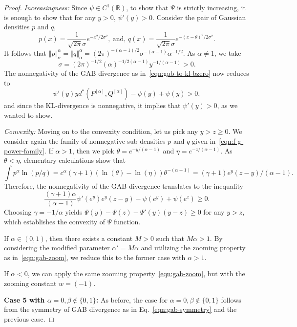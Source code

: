 \documentclass[11pt]{article}
\theoremstyle{plain}
\theoremstyle{remark}
\def\R{\mathbb{R}}
\newcommand{\norm}[1]{\left\Vert #1 \right\Vert}
\begin{document}
\begin{proof}
    \noindent\emph{Increasingness:} Since $\psi \in C^1(\R)$, to show that $\Psi$ is strictly increasing, it is enough to show that for any $y > 0$, $\psi'(y) > 0$. Consider the pair of Gaussian densities $p$ and $q$,
    \begin{equation*}
        p(x) = \dfrac{1}{\sqrt{2\pi} \sigma} e^{-x^2/2\sigma^2}, \
        \text{and, }
        q(x) = \dfrac{1}{\sqrt{2\pi}\sigma}e^{-(x - \theta)^2/2\sigma^2}.
    \end{equation*}
    \noindent It follows that $\norm{p}_{\alpha}^{\alpha} = \norm{q}_{\alpha}^{\alpha} = (2\pi)^{-(\alpha-1)/2}\sigma^{-(\alpha-1)}\alpha^{-1/2}$. As $\alpha \neq 1$, we take
    \begin{equation*}
        \sigma = (2\pi)^{-1/2}(\alpha)^{-1/2(\alpha-1)} y^{-1/(\alpha-1)} > 0.
    \end{equation*}
    \noindent The nonnegativity of the GAB divergence as in~\eqref{eqn:gab-to-kl-bzero} now reduces to
    \begin{equation*}
        \psi'(y)y d^\ast(P^{[\alpha]}, Q^{[\alpha]}) - \psi(y) + \psi(y) > 0,
    \end{equation*}
    \noindent and since the KL-divergence is nonnegative, it implies that $\psi'(y) > 0$, as we wanted to show.

    \noindent\emph{Convexity:} Moving on to the convexity condition, let us pick any $y > z \geq 0$. We consider again the family of nonnegative sub-densities $p$ and $q$ given in~\eqref{eqn:f-g-power-family}. If $\alpha > 1$, then we pick $\theta = e^{-y/(\alpha-1)}$ and $\eta = e^{-z/(\alpha-1)}$. As $\theta < \eta$, elementary calculations show that
    \begin{equation*}
        \int p^\alpha \ln(p/q)
        = c^\alpha (\gamma+1)(\ln(\theta) - \ln(\eta)) \theta^{-(\alpha-1)}
        = (\gamma+1)e^y (z - y)/(\alpha-1).
    \end{equation*}
    \noindent Therefore, the nonnegativity of the GAB divergence translates to the inequality
    \begin{equation*}
        \dfrac{(\gamma+1)\alpha}{(\alpha-1)}\psi'(e^y)e^y (z - y) - \psi(e^y) + \psi(e^z) \geq 0.
    \end{equation*}
    \noindent Choosing $\gamma = -1/\alpha$ yields $\Psi(y) - \Psi(z) - \Psi'(y)(y - z) \geq 0$ for any $y > z$, which establishes the convexity of $\Psi$ function.

    If $\alpha \in (0, 1)$, then there exists a constant $M > 0$ such that $M\alpha > 1$. By considering the modified parameter $\alpha' = M\alpha$ and utilizing the zooming property as in~\eqref{eqn:gab-zoom}, we reduce this to the former case with $\alpha > 1$.

    If $\alpha < 0$, we can apply the same zooming property~\eqref{eqn:gab-zoom}, but with the zooming constant $w = (-1)$.


    \noindent\textbf{Case 5 with $\alpha = 0, \beta \notin \{0, 1\}$:} As before, the case for $\alpha = 0, \beta \notin \{0, 1\}$ follows from the symmetry of GAB divergence as in Eq.~\eqref{eqn:gab-symmetry} and the previous case.
\end{proof}
\end{document}
